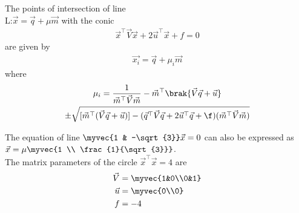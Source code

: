 
\begin{lemma}
The points of intersection of line \\L:$\vec{x}=\vec{q}+\mu \vec{m}$ with the conic 
\begin{align}
\vec{x}^\top\vec{V}\vec{x}+2\vec{u}^\top\vec{x}+f=0
\end{align}
are given by 
\begin{align}  \vec{x_{i}}=\vec{q}+\mu_{i}\vec{m}
\end{align}
where 
\begin{multline}
    \mu_i=\frac{1}{\vec{m}^\top\vec{V}\vec{m}}-\vec{m}^\top\brak{\vec{V}\vec{q}+\vec{u}}\\ \pm\sqrt{[\vec{m}^\top(\vec{V}\vec{q}+\vec{u})]-(\vec{q}^\top\vec{V}\vec{q}+2\vec{u}^\top\vec{q}+\f)(\vec{m}^\top\vec{V}\vec{m})} 
\end{multline}

\end{lemma}
The equation of line $\myvec{1 & -\sqrt{3}}\vec{x}=0$ can also be expressed as $\vec{x}=\mu \myvec{1 \\ \frac{1}{\sqrt{3}}}$.\\
The matrix parameters of the circle $\vec{x}^\top\vec{x}=4$ are
\begin{align}
    \vec{V}&=\myvec{1&0\\0&1}\\
    \vec{u}&=\myvec{0\\0}\\
    f &= -4
\end{align}

